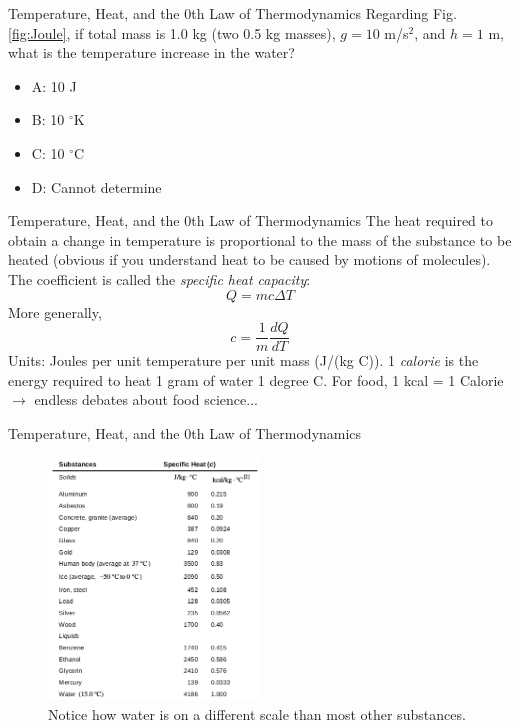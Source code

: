 \documentclass{beamer}
\begin{document}
\begin{frame}{Temperature, Heat, and the 0th Law of Thermodynamics}
Regarding Fig. \ref{fig:Joule}, if total mass is 1.0 kg (two 0.5 kg masses), $g = 10$ m/s$^2$, and $h = 1$ m, what is the temperature increase in the water?
\begin{itemize}
\item A: 10 J
\item B: 10 $^{\circ}$K
\item C: 10 $^{\circ}$C
\item D: Cannot determine
\end{itemize}
\end{frame}

\begin{frame}{Temperature, Heat, and the 0th Law of Thermodynamics}
The heat required to obtain a change in temperature is proportional to the mass of the substance to be heated (obvious if you understand heat to be caused by motions of molecules).  The coefficient is called the \textit{specific heat capacity}:
\begin{equation}
Q = mc\Delta T
\end{equation}
More generally,
\begin{equation}
c = \frac{1}{m}\frac{dQ}{dT}
\end{equation}
Units: Joules per unit temperature per unit mass (J/(kg C)).  1 \textit{calorie} is the energy required to heat 1 gram of water 1 degree C.  For food, 1 kcal = 1 Calorie $\rightarrow$ endless debates about food science...
\end{frame}

\begin{frame}{Temperature, Heat, and the 0th Law of Thermodynamics}
\begin{figure}
\centering
\includegraphics[width=0.5\textwidth]{figures/c.png}
\caption{\label{fig:c} Notice how water is on a different scale than most other substances.}
\end{figure}
\end{frame}
\end{document}
